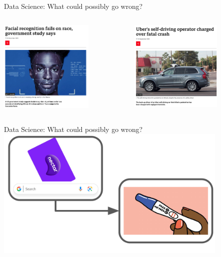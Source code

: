 \begin{frame}{Data Science: What could possibly go wrong?}
 \begin{columns}
 \begin{column}{0.5\textwidth}
    \centering
    \includegraphics[width = 0.7\textwidth]{images/bbc-facial-recognition.png}
 \end{column}
 \begin{column}{0.5\textwidth}
    \centering
    \includegraphics[width = 0.7\textwidth]{images/bbc-self-driving_1.png}
 \end{column}
 \end{columns}
\end{frame} 

\begin{frame}{Data Science: What could possibly go wrong?}
    \centering
    \includegraphics[width = 0.85\textwidth]{images/pregnancy-prediction.pdf}
\end{frame} 

